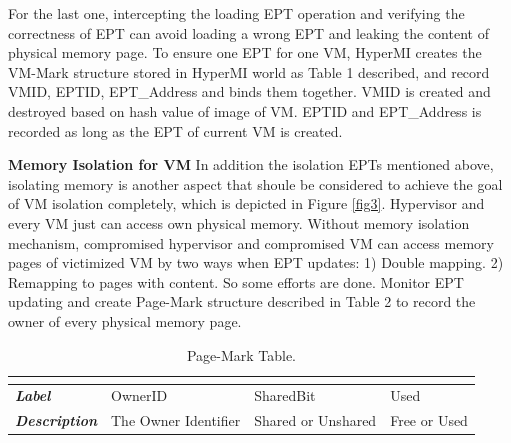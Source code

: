 \documentclass[conference]{IEEEtran}
\begin{document}
For the last one, intercepting the loading EPT operation and verifying the correctness of EPT can avoid loading a wrong EPT and leaking the content of physical memory page. To ensure one EPT for one VM, HyperMI creates the VM-Mark structure stored in HyperMI world as Table 1 described, and record VMID, EPTID, EPT\_Address and binds them together. VMID is created and destroyed based on hash value of image of VM. EPTID and EPT\_Address is recorded as long as the EPT of current VM is created.

\textbf{Memory Isolation for VM }
In addition the isolation EPTs mentioned above, isolating memory is another aspect that shoule be considered to achieve the goal of VM isolation completely, which is depicted in Figure \ref{fig3}. 
Hypervisor and every VM just can access own physical memory. Without memory isolation mechanism, compromised hypervisor and compromised VM can access memory pages of victimized VM by two ways when EPT updates: 1) Double mapping. 2) Remapping to pages with content. So some efforts are done. Monitor EPT updating and create Page-Mark structure described in Table 2 to record the owner of every physical memory page. 

\begin{table}
\centering
\caption{Page-Mark Table.}\label{tab2}
\begin{tabular}{p{1.2cm}|p{1.4cm}|p{1.2cm}|p{1.5cm}}
\hline
\multicolumn{4}{c}{\bfseries\textbf\centering{Page-Mark Table}}\\
\hline
{\itshape\bfseries Label} & OwnerID & SharedBit & Used \\
\hline
{\itshape\bfseries Description} & The Owner Identifier & Shared or Unshared & Free or Used \\
\hline
\end{tabular}
\end{table}
\end{document}
